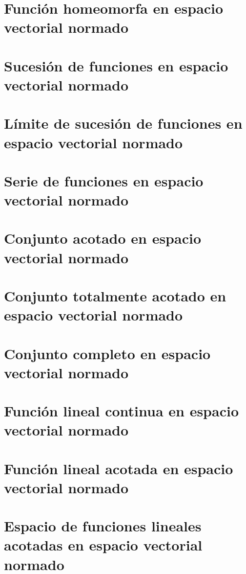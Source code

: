 \section{Función homeomorfa en espacio vectorial normado}

\section{Sucesión de funciones en espacio vectorial normado}

\section{Límite de sucesión de funciones en espacio vectorial normado}

\section{Serie de funciones en espacio vectorial normado}

\section{Conjunto acotado en espacio vectorial normado}

\section{Conjunto totalmente acotado en espacio vectorial normado}

\section{Conjunto completo en espacio vectorial normado}

\section{Función lineal continua en espacio vectorial normado}

\section{Función lineal acotada en espacio vectorial normado}

\section{Espacio de funciones lineales acotadas en espacio vectorial normado}

